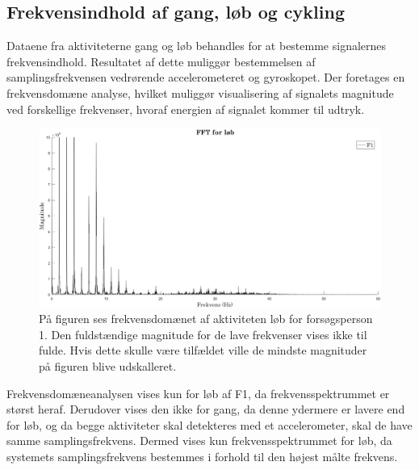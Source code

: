 \subsection{Frekvensindhold af gang, løb og cykling}
Dataene fra aktiviteterne gang og løb behandles for at bestemme signalernes frekvensindhold. Resultatet af dette muliggør bestemmelsen af samplingsfrekvensen vedrørende accelerometeret og gyroskopet. Der foretages en frekvensdomæne analyse, hvilket muliggør visualisering af signalets magnitude ved forskellige frekvenser, hvoraf energien af signalet kommer til udtryk.
\begin{figure}[H]
	\centering
	\includegraphics[width=1\textwidth]{figures/qBilag/fft_f1_loeb}
	\caption{På figuren ses frekvensdomænet af aktiviteten løb for forsøgsperson 1. Den fuldstændige magnitude for de lave frekvenser vises ikke til fulde. Hvis dette skulle være tilfældet ville de mindste magnituder på figuren blive udskalleret.}
	\label{fig:Ap_FFt}
\end{figure}\vspace{-.25cm}
Frekvensdomæneanalysen vises kun for løb af F1, da frekvensspektrummet er størst heraf. Derudover vises den ikke for gang, da denne ydermere er lavere end for løb, og da begge aktiviteter skal detekteres med et accelerometer, skal de have samme samplingsfrekvens. Dermed vises kun frekvensspektrummet for løb, da systemets samplingsfrekvens bestemmes i forhold til den højest målte frekvens.

